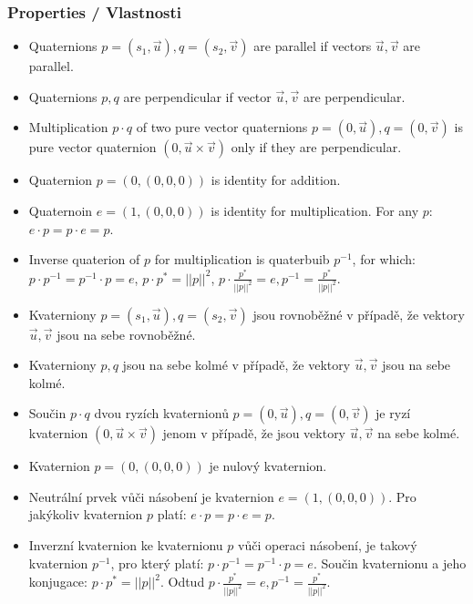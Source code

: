 \begin{frame}\frametitle{Properties / Vlastnosti}\scriptsize
\begin{itemize}
\item Quaternions $p=(s_1,\vec u),q=(s_2,\vec v)$ are parallel if vectors $\vec u,\vec v$ are parallel.
\item Quaternions $p,q$ are perpendicular if vector $\vec u,\vec v$ are perpendicular.
\item Multiplication $p \cdot q$ of two pure vector quaternions $p=(0,\vec u),q=(0,\vec v)$ is pure vector quaternion $(0,\vec u \times \vec v)$ only if they are perpendicular.
\item Quaternion $p=(0,(0,0,0))$ is identity for addition.
\item Quaternoin $e=(1,(0,0,0))$ is identity for multiplication. For any $p$: $e\cdot p=p \cdot e = p$.
\item Inverse quaterion of $p$ for multiplication is quaterbuib $p^{-1}$, for which: $p\cdot p^{-1}=p^{-1}\cdot p=e$, $p\cdot p^*=||p||^2$, $p\cdot \frac{p^{*}}{||p||^2}=e,p^{-1}=\frac{p^*}{||p||^2}$.
\end{itemize}

\begin{itemize}
\item
Kvaterniony $p=(s_1,\vec u),q=(s_2,\vec v)$ jsou rovnoběžné v případě, že vektory $\vec u,\vec v$ jsou na sebe rovnoběžné.
\item
Kvaterniony $p,q$ jsou na sebe kolmé v případě, že vektory $\vec u,\vec v$ jsou na sebe kolmé.
\item
Součin $p \cdot q$ dvou ryzích kvaternionů $p=(0,\vec u),q=(0,\vec v)$ je ryzí kvaternion $(0,\vec u \times \vec v)$ jenom v případě, že jsou vektory $\vec u,\vec v$ na sebe kolmé.
\item
Kvaternion $p=(0,(0,0,0))$ je nulový kvaternion.
\item
Neutrální prvek vůči násobení je kvaternion $e=(1,(0,0,0))$.
Pro jakýkoliv kvaternion $p$ platí: $e\cdot p=p \cdot e = p$.
\item
Inverzní kvaternion ke kvaternionu $p$ vůči operaci násobení, je takový kvaternion $p^{-1}$, pro který platí: $p\cdot p^{-1}=p^{-1}\cdot p=e$.
Součin kvaternionu a jeho konjugace: $p\cdot p^*=||p||^2$.
Odtud $p\cdot \frac{p^{*}}{||p||^2}=e,p^{-1}=\frac{p^*}{||p||^2}$.
\end{itemize}
\end{frame}

